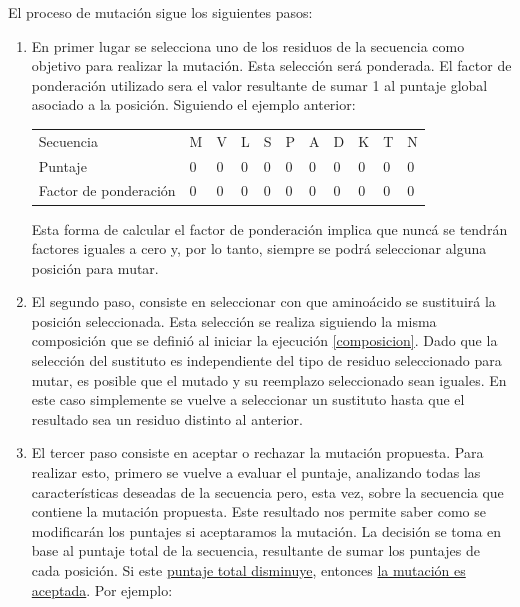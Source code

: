 El proceso de mutación sigue los siguientes pasos:
\begin{enumerate}
 \item En primer lugar se selecciona uno de los residuos de la secuencia como objetivo para realizar la mutación. 
 Esta selección será ponderada. El factor de ponderación utilizado sera el valor resultante de sumar 1 al puntaje global asociado a la posición.
 Siguiendo el ejemplo anterior:
 
 \begin{tabular}{lllllllllll} 
Secuencia &  M & V & L & S & P & A & D & K & T & N\\ 
Puntaje & 0 & 0 & 0 & 0 & 0 & 0 & 0 & 0 & 0 & 0\\
Factor de ponderación & 0 & 0 & 0 & 0 & 0 & 0 & 0 & 0 & 0 & 0\\
\end{tabular}
 
\vspace{0.5cm}
Esta forma de calcular el factor de ponderación implica que nuncá se tendrán factores iguales a cero y, por lo tanto, siempre se podrá seleccionar alguna posición para mutar.

   \item El segundo paso, consiste en seleccionar con que aminoácido se sustituirá la posición seleccionada. 
   Esta selección se realiza siguiendo la misma composición que se definió al iniciar la ejecución \ref{composicion}. 
   Dado que la selección del sustituto es independiente del tipo de residuo seleccionado para mutar,
   es posible que el mutado y su reemplazo seleccionado sean iguales. 
   En este caso simplemente se vuelve a seleccionar un sustituto hasta que el resultado sea un residuo distinto al anterior.     
    \item El tercer paso consiste en aceptar o rechazar la mutación propuesta.
    Para realizar esto, primero se vuelve a evaluar el puntaje, analizando todas las características deseadas de la secuencia pero, esta vez, sobre la secuencia que contiene la mutación propuesta.
    Este resultado nos permite saber como se modificarán los puntajes si aceptaramos la mutación. 
    La decisión se toma en base al puntaje total de la secuencia, resultante de sumar los puntajes de cada posición. Si este  \underline{puntaje total disminuye}, entonces \underline{la mutación es aceptada}. Por ejemplo:


\end{enumerate}
